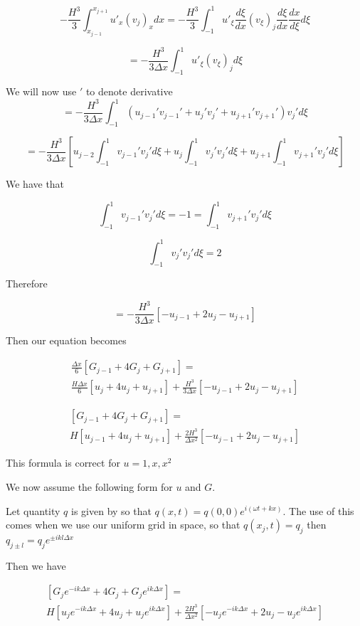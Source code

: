 \documentclass[12pt]{article}
\begin{document}
\[-\frac{H^3}{3}\int_{x_{j-1}}^{x_{j+1}}u'_{x}(v_{j})_{x}dx = -\frac{H^3}{3}\int_{-1}^{1}u'_{\xi}\frac{d \xi }{dx}(v_{\xi})_{j}\frac{d \xi }{dx} \frac{d x}{d\xi} d\xi   \]

\[= -\frac{H^3}{3\Delta x}\int_{-1}^{1}u'_{\xi}(v_{\xi})_{j} d\xi   \]

We will now use $'$ to denote derivative
\[= -\frac{H^3}{3\Delta x}\int_{-1}^{1}\left(u_{j- 1}'v_{j - 1}' + u_{j}'v_{j}' +u_{j+ 1}'v_{j+ 1}' \right)v_{j}' d\xi   \]

\[= -\frac{H^3}{3\Delta x}\left[u_{j- 2} \int_{-1}^{1} v_{j - 1}'v_{j}' d\xi + u_{j} \int_{-1}^{1} v_{j}'v_{j}' d\xi +  u_{j+1} \int_{-1}^{1} v_{j + 1}'v_{j}' d\xi\right]   \]

We have that 

\[\int_{-1}^{1} v_{j-1}'v_{j}' d\xi = -1 = \int_{-1}^{1} v_{j+1}'v_{j}' d\xi \]

\[\int_{-1}^{1} v_{j}'v_{j}' d\xi = 2\]

Therefore

\[= -\frac{H^3}{3\Delta x}\left[-u_{j- 1}  + 2u_{j} -  u_{j+1} \right]   \]

Then our equation becomes

\begin{multline}
\frac{\Delta x}{6} \left[G_{j- 1} + 4G_{j} +  G_{j+1} \right] = \\ \frac{H\Delta x}{6} \left[u_{j} + 4u_{j} +  u_{j+1} \right] +  \frac{H^3}{3\Delta x}\left[-u_{j- 1}  + 2u_{j} -  u_{j+1} \right]
\end{multline}

\begin{multline}
\left[G_{j-1} + 4G_{j} +  G_{j+1} \right] = \\ H \left[u_{j- 1} + 4u_{j} +  u_{j+1} \right] +  \frac{2H^3}{\Delta x^2}\left[-u_{j- 1}  + 2u_{j} -  u_{j+1} \right]
\end{multline}

This formula is correct for $u= 1,x,x^2$
 

We now assume the following form for $u$ and $G$.

Let quantity $q$ is given by so that
$q(x,t) = q(0,0) e^{i\left(\omega t + kx\right)}$. The use of this comes when we use our uniform grid in space, so that $q(x_j,t) = q_j$ then $q_{j \pm l} = q_j e^{\pm ik l\Delta x} $

Then we have 

\begin{multline}
\left[G_j e^{- ik\Delta x} + 4G_j +  G_j e^{ik\Delta x}  \right] = \\ H \left[u_j e^{- ik \Delta x} + 4u_j  +  u_j e^{ik\Delta x}  \right] +  \frac{2H^3}{\Delta x^2}\left[-u_j e^{- ik \Delta x}  + 2u_j  -  u_j e^{ik \Delta x} \right]
\end{multline}
\end{document}
